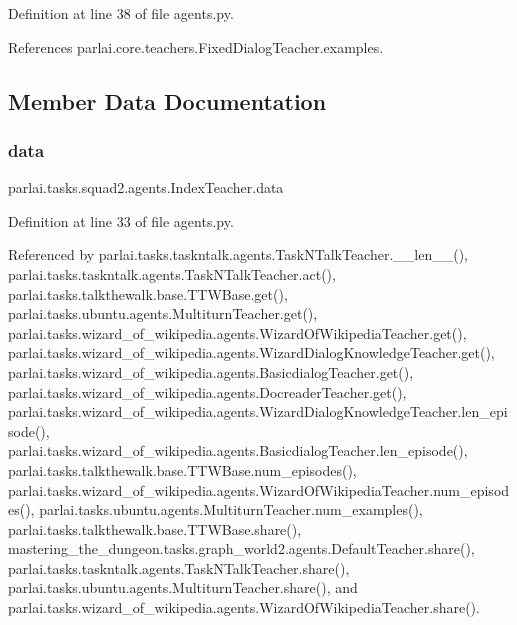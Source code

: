 Definition at line 38 of file agents.\+py.



References parlai.\+core.\+teachers.\+Fixed\+Dialog\+Teacher.\+examples.



\subsection{Member Data Documentation}
\mbox{\label{classparlai_1_1tasks_1_1squad2_1_1agents_1_1IndexTeacher_abb04c653cc52c06137a52a47c68e02b3}} 
\subsubsection{\texorpdfstring{data}{data}}
{\footnotesize\ttfamily parlai.\+tasks.\+squad2.\+agents.\+Index\+Teacher.\+data}



Definition at line 33 of file agents.\+py.



Referenced by parlai.\+tasks.\+taskntalk.\+agents.\+Task\+N\+Talk\+Teacher.\+\_\+\+\_\+len\+\_\+\+\_\+(), parlai.\+tasks.\+taskntalk.\+agents.\+Task\+N\+Talk\+Teacher.\+act(), parlai.\+tasks.\+talkthewalk.\+base.\+T\+T\+W\+Base.\+get(), parlai.\+tasks.\+ubuntu.\+agents.\+Multiturn\+Teacher.\+get(), parlai.\+tasks.\+wizard\+\_\+of\+\_\+wikipedia.\+agents.\+Wizard\+Of\+Wikipedia\+Teacher.\+get(), parlai.\+tasks.\+wizard\+\_\+of\+\_\+wikipedia.\+agents.\+Wizard\+Dialog\+Knowledge\+Teacher.\+get(), parlai.\+tasks.\+wizard\+\_\+of\+\_\+wikipedia.\+agents.\+Basicdialog\+Teacher.\+get(), parlai.\+tasks.\+wizard\+\_\+of\+\_\+wikipedia.\+agents.\+Docreader\+Teacher.\+get(), parlai.\+tasks.\+wizard\+\_\+of\+\_\+wikipedia.\+agents.\+Wizard\+Dialog\+Knowledge\+Teacher.\+len\+\_\+episode(), parlai.\+tasks.\+wizard\+\_\+of\+\_\+wikipedia.\+agents.\+Basicdialog\+Teacher.\+len\+\_\+episode(), parlai.\+tasks.\+talkthewalk.\+base.\+T\+T\+W\+Base.\+num\+\_\+episodes(), parlai.\+tasks.\+wizard\+\_\+of\+\_\+wikipedia.\+agents.\+Wizard\+Of\+Wikipedia\+Teacher.\+num\+\_\+episodes(), parlai.\+tasks.\+ubuntu.\+agents.\+Multiturn\+Teacher.\+num\+\_\+examples(), parlai.\+tasks.\+talkthewalk.\+base.\+T\+T\+W\+Base.\+share(), mastering\+\_\+the\+\_\+dungeon.\+tasks.\+graph\+\_\+world2.\+agents.\+Default\+Teacher.\+share(), parlai.\+tasks.\+taskntalk.\+agents.\+Task\+N\+Talk\+Teacher.\+share(), parlai.\+tasks.\+ubuntu.\+agents.\+Multiturn\+Teacher.\+share(), and parlai.\+tasks.\+wizard\+\_\+of\+\_\+wikipedia.\+agents.\+Wizard\+Of\+Wikipedia\+Teacher.\+share().

